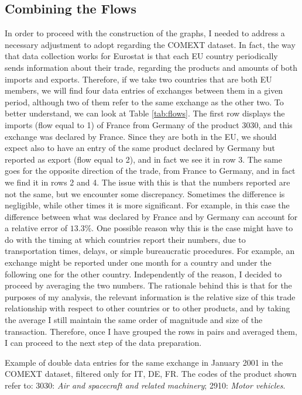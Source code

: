 \subsection{Combining the Flows}
In order to proceed with the construction of the graphs, I needed to address a necessary adjustment to adopt regarding the COMEXT dataset. In fact, the way that data collection works for Eurostat is that each EU country periodically sends information about their trade, regarding the products and amounts of both imports and exports. Therefore, if we take two countries that are both EU members, we will find four data entries of exchanges between them in a given period, although two of them refer to the same exchange as the other two. To better understand, we can look at Table \ref{tab:flows}. The first row displays the imports (flow equal to 1) of France from Germany of the product 3030, and this exchange was declared by France. Since they are both in the EU, we should expect also to have an entry of the same product declared by Germany but reported as export (flow equal to 2), and in fact we see it in row 3. The same goes for the opposite direction of the trade, from France to Germany, and in fact we find it in rows 2 and 4. The issue with this is that the numbers reported are not the same, but we encounter some discrepancy. Sometimes the difference is negligible, while other times it is more significant. For example, in this case the difference between what was declared by France and by Germany can account for a relative error of $13.3\%$. One possible reason why this is the case might have to do with the timing at which countries report their numbers, due to transportation times, delays, or simple bureaucratic procedures. For example, an exchange might be reported under one month for a country and under the following one for the other country.
Independently of the reason, I decided to proceed by averaging the two numbers. The rationale behind this is that for the purposes of my analysis, the relevant information is the relative size of this trade relationship with respect to other countries or to other products, and by taking the average I still maintain the same order of magnitude and size of the transaction.
Therefore, once I have grouped the rows in pairs and averaged them, I can proceed to the next step of the data preparation.

\begin{table}
    \centering
    
    \caption[Example of double data entries for the same exchange in January 2001 in the COMEXT dataset, filtered only for IT, DE, FR.]{Example of double data entries for the same exchange in January 2001 in the COMEXT dataset, filtered only for IT, DE, FR. The codes of the product shown refer to: 3030: \textit{Air and spacecraft and related machinery}; 2910: \textit{Motor vehicles}.}
    \label{tab:flows}
\end{table}


